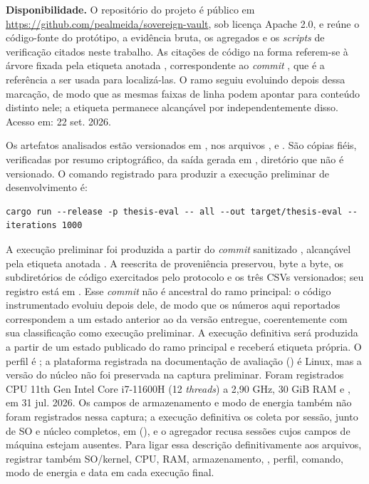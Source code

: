 \documentclass[12pt,openright,twoside,a4paper,english,brazil]{abntex2}
\begin{document}
\begin{apendicesenv}
{\sloppy \textbf{Disponibilidade.} O repositório do projeto é público em \url{https://github.com/pealmeida/sovereign-vault}, sob licença Apache 2.0, e reúne o código-fonte do protótipo, a evidência bruta, os agregados e os \textit{scripts} de verificação citados neste trabalho. As citações de código na forma  referem-se à árvore fixada pela etiqueta anotada , correspondente ao \textit{commit} , que é a referência a ser usada para localizá-las. O ramo  seguiu evoluindo depois dessa marcação, de modo que as mesmas faixas de linha podem apontar para conteúdo distinto nele; a etiqueta permanece alcançável por  independentemente disso. Acesso em: 22 set. 2026.\par}
Os artefatos analisados estão versionados em , nos arquivos ,  e . São cópias fiéis, verificadas por resumo criptográfico, da saída gerada em , diretório que não é versionado. O comando registrado para produzir a execução preliminar de desenvolvimento é:
\begingroup
\footnotesize
\begin{verbatim}
cargo run --release -p thesis-eval -- all --out target/thesis-eval --iterations 1000
\end{verbatim}
\endgroup
A execução preliminar foi produzida a partir do \textit{commit} sanitizado , alcançável pela etiqueta anotada . A reescrita de proveniência preservou, byte a byte, os subdiretórios de código exercitados pelo protocolo e os três CSVs versionados; seu registro está em . Esse \textit{commit} não é ancestral do ramo principal: o código instrumentado evoluiu depois dele, de modo que os números aqui reportados correspondem a um estado anterior ao da versão entregue, coerentemente com sua classificação como execução preliminar. A execução definitiva será produzida a partir de um estado publicado do ramo principal e receberá etiqueta própria. O perfil é ; a plataforma registrada na documentação de avaliação () é Linux, mas a versão do núcleo não foi preservada na captura preliminar. Foram registrados CPU 11th Gen Intel Core i7-11600H (12 \textit{threads}) a 2,90 GHz, 30 GiB RAM e , em 31 jul. 2026. Os campos de armazenamento e modo de energia também não foram registrados nessa captura; a execução definitiva os coleta por sessão, junto de SO e núcleo completos, em  (), e o agregador recusa sessões cujos campos de máquina estejam ausentes. Para ligar essa descrição definitivamente aos arquivos, registrar também SO/kernel, CPU, RAM, armazenamento, , perfil, comando, modo de energia e data em cada execução final.


\end{apendicesenv}
\end{document}
